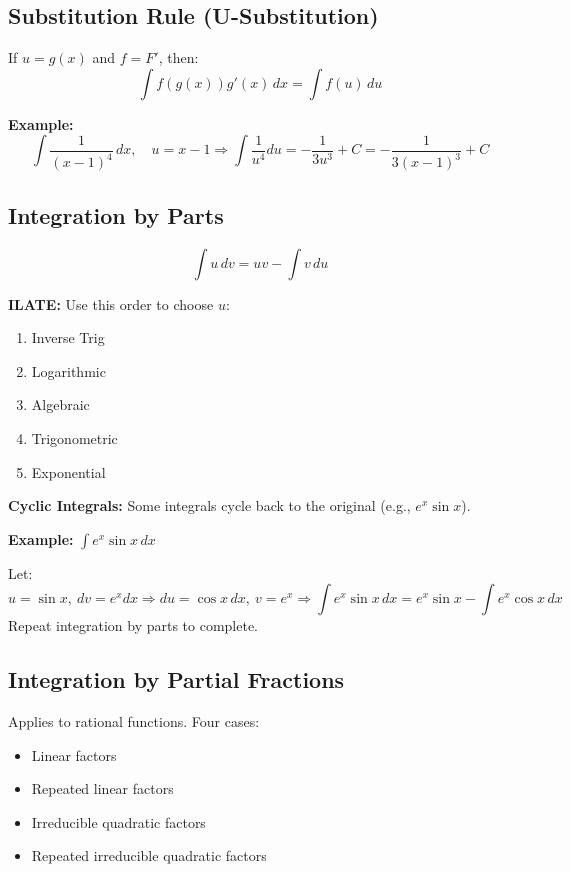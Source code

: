 \subsection{Substitution Rule (U-Substitution)}

If \(u = g(x)\) and \(f = F'\), then:
\[
\int f(g(x))g'(x)\,dx = \int f(u)\,du
\]

\textbf{Example:}
\[
\int \frac{1}{(x - 1)^4}\,dx, \quad u = x - 1 \Rightarrow \int \frac{1}{u^4} du = -\frac{1}{3u^3} + C = -\frac{1}{3(x - 1)^3} + C
\]

\subsection{Integration by Parts}

\[
\int u\,dv = uv - \int v\,du
\]

\textbf{ILATE:} Use this order to choose \(u\):
\begin{enumerate}
    \item Inverse Trig
    \item Logarithmic
    \item Algebraic
    \item Trigonometric
    \item Exponential
\end{enumerate}

\textbf{Cyclic Integrals:} Some integrals cycle back to the original (e.g., \(e^x \sin x\)).

\textbf{Example:} \(\int e^x \sin x\,dx\)

Let:
\[
u = \sin x,\ dv = e^x dx \Rightarrow du = \cos x\,dx,\ v = e^x
\Rightarrow \int e^x \sin x\,dx = e^x \sin x - \int e^x \cos x\,dx
\]
Repeat integration by parts to complete.

\subsection{Integration by Partial Fractions}

Applies to rational functions. Four cases:

\begin{itemize}[label=\(-\)]
\item Linear factors
\item Repeated linear factors
\item Irreducible quadratic factors
\item Repeated irreducible quadratic factors
\end{itemize}

